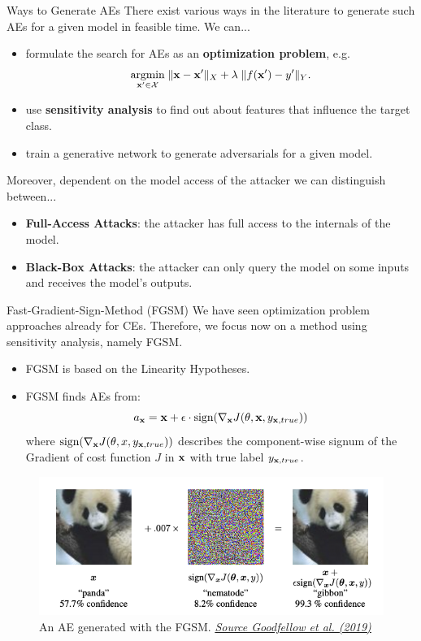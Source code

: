 \documentclass[11pt,compress,t,notes=noshow, xcolor=table]{beamer}
\begin{document}
\begin{vbframe}{Ways to Generate AEs}
There exist various ways in the literature to generate such AEs for a given model in feasible time. We can...
\begin{itemize}
    \item formulate the search for AEs as an \textbf{optimization problem}, e.g. 
    \begin{equation*}
        \label{eq:optimization}
        \underset{\xv'\in \Xspace}{\text{argmin}}\; \| \xv-\xv' \|_X+\lambda\;    \|f(\xv')-y'\|_Y.
    \end{equation*}
    \item use \textbf{sensitivity analysis} to find out about features that influence the target class.
    \item train a generative network to generate adversarials for a given model.
\end{itemize}
Moreover, dependent on the model access of the attacker we can distinguish between...
\begin{itemize}
    \item \textbf{Full-Access Attacks}: the attacker has full access to the internals of the model.
    \item \textbf{Black-Box Attacks}: the attacker can only query the model on some inputs and receives the model's outputs.
\end{itemize}
\end{vbframe}

\begin{vbframe}{Fast-Gradient-Sign-Method (FGSM)}
We have seen optimization problem approaches already for CEs. Therefore, we focus now on a method using sensitivity analysis, namely FGSM.
\begin{itemize}
    \item FGSM is based on the Linearity Hypotheses.
    \item FGSM finds AEs from:
    \begin{equation*}
        a_{\xv}=\xv+\epsilon\cdot\text{sign}(\nabla_{\xv} J(\theta,\xv,y_{\xv,true}))
    \end{equation*}
    where $\text{sign}(\nabla_{\xv} J(\theta,x,y_{\xv,true}))$ describes the component-wise signum of the Gradient of cost function $J$ in $\xv$ with true label $y_{\xv,true}$.
\end{itemize}
\begin{figure}[h]
\centering
\includegraphics[width=0.44\linewidth]{figure/AEpanda.png}
  \caption{An AE generated with the FGSM. \href{https://arxiv.org/pdf/1412.6572.pdf}{\textit{Source Goodfellow et al. (2019)}}}
  \label{fig:mnist}
\end{figure} 
\end{vbframe}
\end{document}
